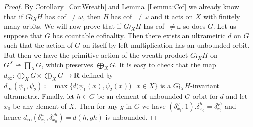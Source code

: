 \documentclass[a4paper]{article}
\theoremstyle{definition}
\newcommand{\setst}[2]{\{#1\ |\ #2\}}
\begin{document}
\begin{proof}
By Corollary~\ref{Cor:Wreath} and Lemma~\ref{Lemma:Cof} we already know that if $G \wr_X H$ has cof~$\neq\omega$, then $H$ has cof~$\neq\omega$ and it acts on $X$ with finitely many orbits.
We will now prove that if $G \wr_X H$ has cof~$\neq\omega$ so does $G$.
Let us suppose that $G$ has countable cofinality. Then there exists an ultrametric $d$ on $G$ such that the action of $G$ on itself by left multiplication has an unbounded orbit.
But then we have the primitive action of the wreath product $G\wr_XH$ on $G^X\cong\prod_XG$,
which preserves $\bigoplus_XG$.
It is easy to check that the map $d_\infty\colon\bigoplus_XG\times\bigoplus_XG\to\mathbf R$ defined by $d_\infty(\psi_1,\psi_2)\coloneqq\max\setst{d\bigl(\psi_1(x),\psi_2(x)\bigr)}{x\in X}$ is a $G\wr_XH$-invariant ultrametric.
Finally, let $h\in G$ be an element of unbounded $G$-orbit for $d$ and let $x_0$ be any element of $X$.
Then for any $g$ in $G$ we have $(\delta_{x_0}^g,1).\delta_{x_0}^h=\delta_{x_0}^{gh}$ and hence $d_\infty(\delta_{x_0}^h,\delta_{x_0}^{gh})=d(h,gh)$ is unbounded.


\end{proof}
\end{document}
